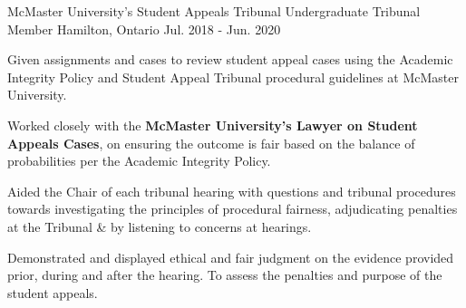 \begin{cventries}
  \cventry
    {McMaster University's Student Appeals Tribunal} %
    {Undergraduate Tribunal Member} %
    {Hamilton, Ontario} %
    {Jul. 2018 - Jun. 2020} %
     {\renewcommand{\labelitemii}{\bullet}
      \begin{cvitems}%
                \item {Given assignments and cases to review student appeal cases using the Academic Integrity Policy and Student Appeal Tribunal procedural guidelines at McMaster University.}
                \item{Worked closely with the \textbf{McMaster University's Lawyer on Student Appeals Cases}, on ensuring the outcome is fair based on the balance of probabilities per the Academic Integrity Policy. }
                \item {Aided the Chair of each tribunal hearing with questions and tribunal procedures towards investigating the principles of procedural fairness, adjudicating penalties at the Tribunal \& by listening to concerns at hearings.}
                \item {Demonstrated and displayed ethical and fair judgment on the evidence provided prior, during and after the hearing. To assess the penalties and purpose of the student appeals.}
      \end{cvitems}
    }
    

\end{cventries}